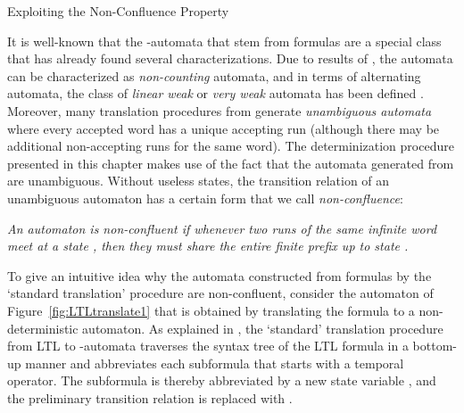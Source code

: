 \documentclass[copyright,creativecommons]{eptcs}
\begin{document}
\begin{section}{Exploiting the Non-Confluence Property}
\label{NonConfluenceProperty}

It is well-known that the -automata that stem from  formulas are a special class that has already found several characterizations. Due to results of \cite{McPa71}, the automata can be characterized as \emph{non-counting} automata, and in terms of alternating automata, the class of \emph{linear weak} or \emph{very weak} automata has been defined \cite{MeSe03,MuSS86b}. Moreover, many translation procedures from  generate {\em unambiguous automata} \cite{CaMi03} where every accepted word has a unique accepting run \cite{Schn03} (although there may be additional non-accepting runs for the same word). The determinization procedure presented in this chapter makes use of the fact that the automata generated from  are unambiguous. Without useless states, the transition relation of an unambiguous automaton has a certain form that we call \emph{non-confluence}:

\begin{center}
\begin{minipage}{13cm}
\emph{An automaton is non-confluent if whenever two runs of the same infinite word meet at a state , then they must share the entire finite prefix up to state .}
\end{minipage}
\end{center}

\noindent To give an intuitive idea why the automata constructed from  formulas by the `standard translation' procedure are non-confluent, consider the automaton of Figure~\ref{fig:LTLtranslate1} that is obtained by translating the formula  to a non-deterministic automaton.
As explained in \cite{Schn01b,Schn03}, the `standard' translation procedure from LTL to -automata traverses the syntax tree of the LTL formula in a bottom-up manner and abbreviates each subformula that starts with a temporal operator. The subformula  is thereby abbreviated by a new state variable , and the preliminary transition relation  is replaced with .

\begin{figure}
\centering
{}
\end{figure}
\end{section}
\end{document}
